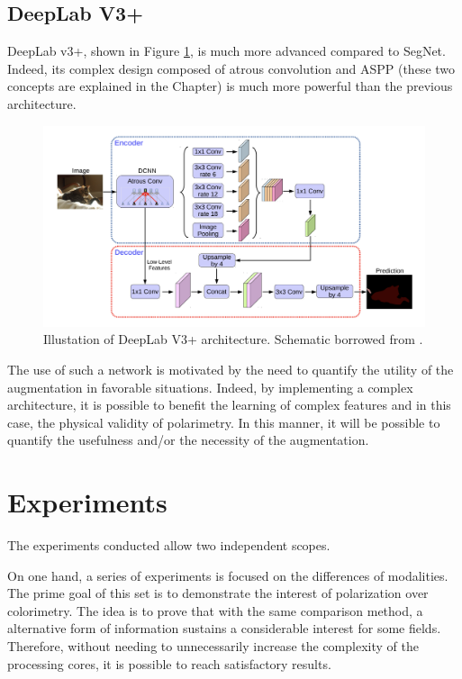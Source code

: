 \subsection{DeepLab V3+}\label{deeplab_sec}

DeepLab v3+\cite{chen2017rethinking}, shown in Figure \ref{deeplab-fig}, is much more advanced compared to SegNet. Indeed, its complex design composed of atrous convolution and ASPP (these two concepts are explained in the Chapter) is much more powerful than the previous architecture. 
\begin{figure}[h]
	\centering
	\includegraphics[width=\linewidth]{Figures/DL/deeplab-arch.png}
	\caption[Illustation of DeepLab V3+ architecture.]{Illustation of DeepLab V3+ architecture. Schematic borrowed from \cite{chen2017rethinking}.}\label{deeplab-fig}
\end{figure}


The use of such a network is motivated by the need to quantify the utility of the augmentation in favorable situations. Indeed, by implementing a complex architecture, it is possible to benefit the learning of complex features and in this case, the physical validity of polarimetry. 
In this manner, it will be possible to quantify the usefulness and/or the necessity of the augmentation.



\section{Experiments}\label{exp_4}

The experiments conducted allow two independent scopes.


On one hand, a series of experiments is focused on the differences of modalities. The prime goal of this set is to demonstrate the interest of polarization over colorimetry. The idea is to prove that with the same comparison method, a alternative form of information sustains a considerable interest for some fields. Therefore, without needing to unnecessarily increase the complexity of the processing cores, it is possible to reach satisfactory results.



